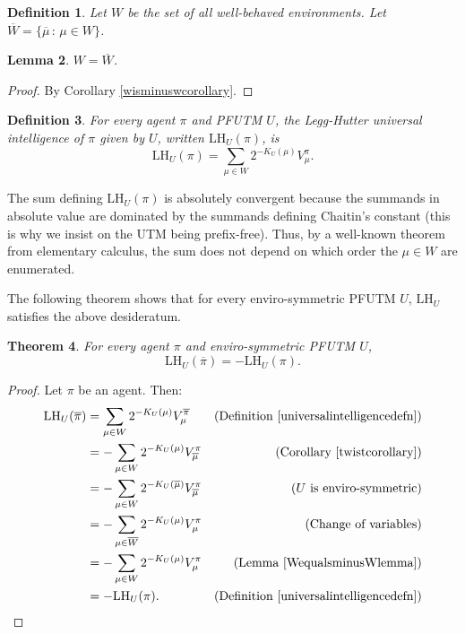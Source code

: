 \documentclass{article}
\newtheorem{theorem}{Theorem}
\newtheorem{definition}[theorem]{Definition}
\newtheorem{lemma}[theorem]{Lemma}
\def\LH{\textrm{LH}}
\begin{document}
\begin{definition}
    Let $W$ be the set of all well-behaved environments.
    Let $\overline W=\{\overline\mu\,:\,\mu\in W\}$.
\end{definition}

\begin{lemma}
\label{WequalsminusWlemma}
$W=\overline W$.
\end{lemma}

\begin{proof}
    By Corollary \ref{wisminuswcorollary}.
\end{proof}

\begin{definition}
\label{universalintelligencedefn}
For every agent $\pi$
and PFUTM $U$, the \emph{Legg-Hutter universal intelligence of $\pi$ given
by $U$}, written $\LH_U(\pi)$, is
\[
    \LH_U(\pi) = \sum_{\mu \in W} 2^{-K_U(\mu)}V^\pi_\mu.
\]
\end{definition}

The sum defining $\LH_U(\pi)$ is absolutely convergent because the summands
in absolute value are dominated by the summands defining Chaitin's constant
(this is why we insist on the UTM being prefix-free).
Thus, by a well-known
theorem from elementary calculus, the sum does not depend on which order the $\mu\in W$
are enumerated.

The following theorem shows that for every enviro-symmetric PFUTM $U$, $\LH_U$
satisfies the above desideratum.

\begin{theorem}
\label{maintheorem}
    For every agent $\pi$ and enviro-symmetric PFUTM $U$,
    \[
        \LH_U(\overline\pi) = -\LH_U(\pi).
    \]
\end{theorem}

\begin{proof}
    Let $\pi$ be an agent. Then:
    \begin{align*}
        \LH_U(\overline\pi) &= \sum_{\mu\in W} 2^{-K_U(\mu)}V^{\overline\pi}_\mu
            &\mbox{(Definition \ref{universalintelligencedefn})}\\
          &= -\sum_{\mu\in W} 2^{-K_U(\mu)}V^\pi_{\overline\mu}
            &\mbox{(Corollary \ref{twistcorollary})}\\
          &= -\sum_{\mu\in W} 2^{-K_U(\overline\mu)}V^\pi_{\overline\mu}
            &\mbox{($U$ is enviro-symmetric)}\\
          &= -\sum_{\mu\in \overline W} 2^{-K_U(\mu)}V^\pi_\mu
            &\mbox{(Change of variables)}\\
          &= -\sum_{\mu\in W} 2^{-K_U(\mu)}V^\pi_\mu
            &\mbox{(Lemma \ref{WequalsminusWlemma})}\\
          &= -\LH_{U}(\pi).
            &\mbox{(Definition \ref{universalintelligencedefn})}
    \end{align*}
\end{proof}
\end{document}
